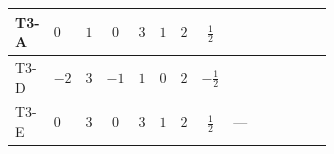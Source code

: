 \documentclass[8pt]{article}
\begin{document}
\begin{landscape}
\begin{longtable}{@{}llcccccc >{\raggedright\arraybackslash}p{0.21\linewidth} >{\raggedright\arraybackslash}p{0.21\linewidth} >{\raggedright\arraybackslash}p{0.21\linewidth}@{}}
\midrule
T3-A & $0$ & $1$ & $0$ & $3$ & $1$ & $2$ & $\frac{1}{2}$ & \scriptsize\adjustbox{max width=\linewidth}{$\begin{gathered} +6 {\lambda_{12}} {\lambda_{H2}}\end{gathered}$} & \scriptsize\adjustbox{max width=\linewidth}{$\begin{gathered} +6 {\lambda_H} {\lambda_{H1}}\end{gathered}$} & \scriptsize\adjustbox{max width=\linewidth}{$\begin{gathered} +4 {\lambda_{H1}}^2\end{gathered}$} \\
\midrule
T3-D & $-2$ & $3$ & $-1$ & $1$ & $0$ & $2$ & $-\frac{1}{2}$ & \scriptsize\adjustbox{max width=\linewidth}{$\begin{gathered} +2 {\lambda_{12}} {\lambda_{H2}}\end{gathered}$} & \scriptsize\adjustbox{max width=\linewidth}{$\begin{gathered} +6 {\lambda_H} {\lambda_{H1}}\end{gathered}$} & \scriptsize\adjustbox{max width=\linewidth}{$\begin{gathered} +4 {\lambda_{H1}}^2\end{gathered}$} \\
\midrule
T3-E & $0$ & $3$ & $0$ & $3$ & $1$ & $2$ & $\frac{1}{2}$ & --- & \scriptsize\adjustbox{max width=\linewidth}{$\begin{gathered} +6 {\lambda_H} {\lambda_{H1}}\end{gathered}$} & \scriptsize\adjustbox{max width=\linewidth}{$\begin{gathered} +4 {\lambda_{H1}}^2\end{gathered}$} \\
\midrule
\bottomrule
\end{longtable}
\clearpage

\end{landscape}
\end{document}
